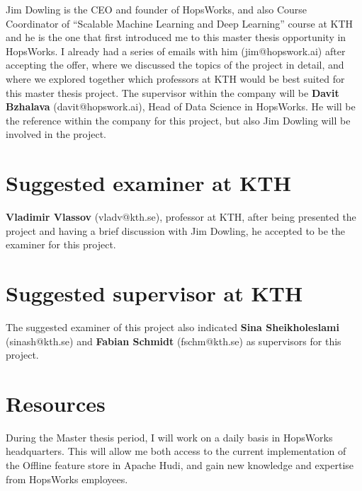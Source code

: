 \documentclass[12pt,twoside,english]{article}
\begin{document}
Jim Dowling is the CEO and founder of HopsWorks, and also Course Coordinator of “Scalable Machine Learning and Deep Learning” course at KTH and he is the one that first introduced me to this master thesis opportunity in HopsWorks.
I already had a series of emails with him (jim@hopswork.ai) after accepting the offer, where we discussed the topics of the project in detail, and where we explored together which professors at KTH would be best suited for this master thesis project.
The supervisor within the company will be \textbf{Davit Bzhalava} (davit@hopswork.ai), Head of Data Science in HopsWorks. He will be the reference within the company for this project, but also Jim Dowling will be involved in the project.

\section{Suggested examiner at KTH}

\textbf{Vladimir Vlassov} (vladv@kth.se), professor at KTH, after being presented the project and having a brief discussion with Jim Dowling, he accepted to be the examiner for this project.

\section{Suggested supervisor at KTH}

The suggested examiner of this project also indicated \textbf{Sina Sheikholeslami} (sinash@kth.se) and \textbf{Fabian Schmidt} (fschm@kth.se) as supervisors for this project.

\section{Resources}

During the Master thesis period, I will work on a daily basis in HopsWorks headquarters. This will allow me both access to the current implementation of the Offline feature store in Apache Hudi, and gain new knowledge and expertise from HopsWorks employees. 
\end{document}

